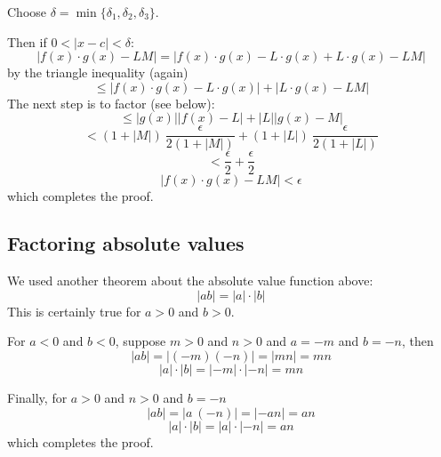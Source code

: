 \documentclass[11pt, oneside]{article}   	%
\begin{document}
Choose $\delta = \min \{\delta_1,\delta_2,\delta_3\}$.

Then if $0 < |x - c| < \delta$:
\[ |f(x) \cdot g(x) - LM| = |f(x) \cdot g(x) - L \cdot g(x) + L \cdot g(x) - LM| \]
by the triangle inequality (again)
\[ \le |f(x) \cdot g(x) - L \cdot g(x)| + |L \cdot g(x) - LM| \]
The next step is to factor (see below):
\[ \le |g(x)| |f(x) - L| + |L| |g(x) - M| \]
\[ < (1 + |M|) \ \frac{\epsilon}{2(1 + |M|)} + (1 + |L|) \ \frac{\epsilon}{2(1 + |L|)} \]
\[ < \frac{\epsilon}{2} + \frac{\epsilon}{2} \]
\[ |f(x) \cdot g(x) - LM| < \epsilon \]
which completes the proof.

\subsection*{Factoring absolute values}

We used another theorem about the absolute value function above:
\[ |ab| = |a| \cdot |b| \]
This is certainly true for $a > 0$ and $b > 0$.  

For $a < 0$ and $b < 0$, suppose $m > 0$ and $n > 0$ and $a = -m$ and $b = -n$, then
\[ |ab| =  |(-m)(-n)| = |mn| = mn \]
\[ |a| \cdot |b| = |-m| \cdot |-n| = mn \]

Finally, for $a > 0$ and $n > 0$ and $b = -n$
\[ |ab| = |a \ (-n)| = |-an| = an \]
\[  |a| \cdot |b| = |a| \cdot |-n| = an \]
which completes the proof.
\end{document}
